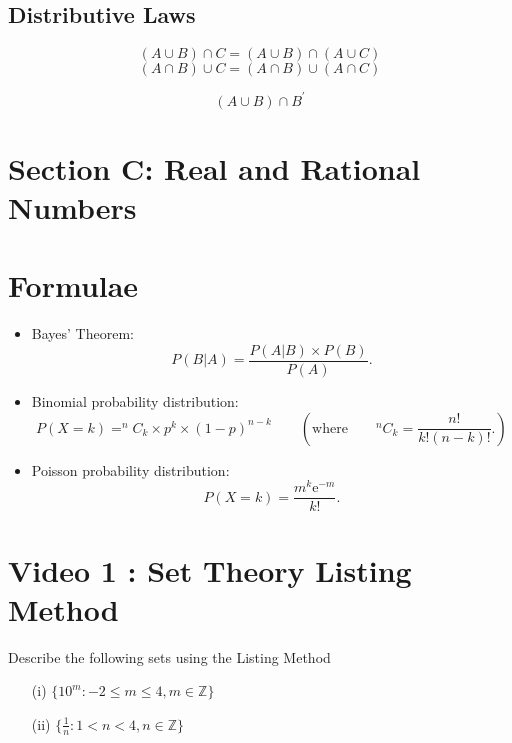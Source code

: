 \documentclass[]{report}
\begin{document}
\begin{enumerate}
\subsection*{Distributive Laws}
\[ (A \cup B) \cap C =  (A \cup B) \cap (A \cup C)  \]
\[ (A \cap B) \cup C =  (A \cap B) \cup (A \cap C)  \]


\[ (A \cup B) \cap B^{\prime} \]
\section*{Section C: Real and Rational Numbers}

\newpage
\section*{Formulae}
\begin{itemize}




\item Bayes' Theorem:
\begin{equation*}
P(B|A)=\frac{P\left(A|B\right) \times P(B) }{P\left( A\right) }.
\end{equation*}



\item Binomial probability distribution:
\begin{equation*}
P(X = k) = ^{n}C_{k} \times p^{k} \times \left( 1-p\right) ^{n-k}\qquad \left( \text{where}\qquad
^{n}C_{k} =\frac{n!}{k!\left(n-k\right) !}. \right)
\end{equation*}

\item Poisson probability distribution:
\begin{equation*}
P(X = k) =\frac{m^{k}\mathrm{e}^{-m}}{k!}.
\end{equation*}
\end{itemize}

\section{Video 1 :  Set Theory Listing Method}


Describe the following sets using the Listing Method

\begin{itemize}
\item[(i)] $ \{ 10^m : -2 \leq m \leq 4, m \in \mathbb{Z} \} $
\item[(ii)]  $ \{ \frac{1}{n}: 1 < n < 4, n \in \mathbb{Z} \} $
\end{itemize}



\end{enumerate}
\end{document}

